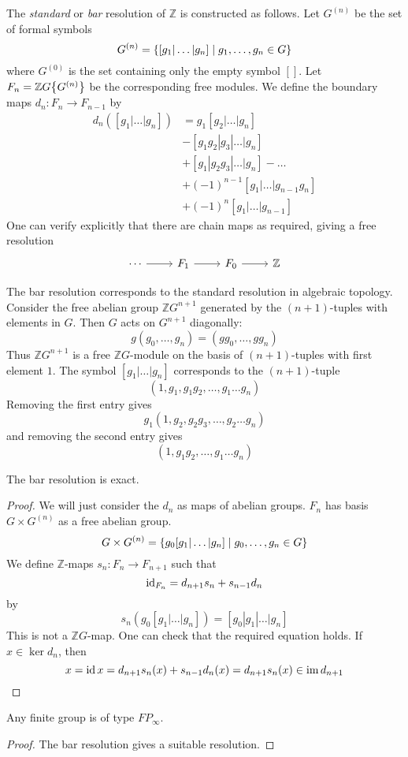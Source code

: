\begin{definition}
    The \emph{standard} or \emph{bar} resolution of \( \mathbb Z \) is constructed as follows.
    Let \( G^{(n)} \) be the set of formal symbols
    \[ G^{(n)} = \qty{[g_1 | \dots | g_n] \mid g_1, \dots, g_n \in G} \]
    where \( G^{(0)} \) is the set containing only the empty symbol \( [] \).
    Let \( F_n = \mathbb Z G \qty{G^{(n)}} \) be the corresponding free modules.
    We define the boundary maps \( d_n : F_n \to F_{n-1} \) by
    \begin{align*}
        d_n([g_1 | \dots | g_n]) &= g_1[g_2 | \dots | g_n] \\
        &- [g_1 g_2 | g_3 | \dots | g_n] \\
        &+ [g_1 | g_2 g_3 | \dots | g_n] - \dots \\
        &+ (-1)^{n-1} [g_1 | \dots | g_{n-1} g_n] \\
        &+ (-1)^n [g_1 | \dots | g_{n-1}]
    \end{align*}
    One can verify explicitly that there are chain maps as required, giving a free resolution
\[\begin{tikzcd}
	\cdots & {F_1} & {F_0} & {\mathbb Z}
	\arrow[from=1-1, to=1-2]
	\arrow[from=1-2, to=1-3]
	\arrow[from=1-3, to=1-4]
\end{tikzcd}\]
\end{definition}
\begin{remark}
    The bar resolution corresponds to the standard resolution in algebraic topology.
    Consider the free abelian group \( \mathbb Z G^{n+1} \) generated by the \( (n + 1) \)-tuples with elements in \( G \).
    Then \( G \) acts on \( G^{n+1} \) diagonally:
    \[ g(g_0, \dots, g_n) = (gg_0, \dots, gg_n) \]
    Thus \( \mathbb Z G^{n+1} \) is a free \( \mathbb Z G \)-module on the basis of \( (n + 1) \)-tuples with first element \( 1 \).
    The symbol \( [g_1 | \dots | g_n] \) corresponds to the \( (n + 1) \)-tuple
    \[ (1, g_1, g_1 g_2, \dots, g_1 \dots g_n) \]
    Removing the first entry gives
    \[ g_1 (1, g_2, g_2 g_3, \dots, g_2 \dots g_n) \]
    and removing the second entry gives
    \[ (1, g_1 g_2, \dots, g_1 \dots g_n) \]
\end{remark}
\begin{lemma}
    The bar resolution is exact.
\end{lemma}
\begin{proof}
    We will just consider the \( d_n \) as maps of abelian groups.
    \( F_n \) has basis \( G \times G^{(n)} \) as a free abelian group.
    \[ G \times G^{(n)} = \qty{g_0 [g_1 | \dots | g_n] \mid g_0, \dots, g_n \in G} \]
    We define \( \mathbb Z \)-maps \( s_n : F_n \to F_{n+1} \) such that
    \[ \operatorname{id}_{F_n} = d_{n+1} s_n + s_{n-1} d_n \]
    by
    \[ s_n(g_0[g_1 | \dots | g_n]) = [g_0 | g_1 | \dots | g_n] \]
    This is not a \( \mathbb Z G \)-map.
    One can check that the required equation holds.
    If \( x \in \ker d_n \), then
    \[ x = \operatorname{id} x = d_{n+1} s_n(x) + s_{n-1} d_n(x) = d_{n+1} s_n(x) \in \operatorname{im} d_{n+1} \]
\end{proof}
\begin{corollary}
    Any finite group is of type \( FP_\infty \).
\end{corollary}
\begin{proof}
    The bar resolution gives a suitable resolution.
\end{proof}
